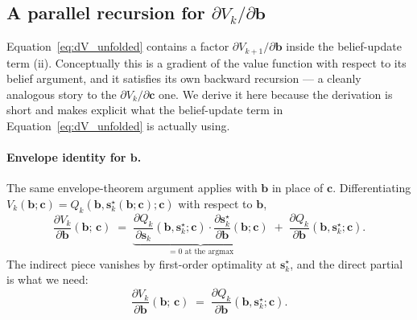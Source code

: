 \documentclass[11pt]{article}
\newcommand{\bc}{\bm{c}}
\newcommand{\bs}{\bm{s}}
\newcommand{\bb}{\bm{b}}
\begin{document}
\subsection{A parallel recursion for \texorpdfstring{$\partial V_k / \partial \bb$}{dV\_k/db}}
\label{sec:dV_db}

Equation~\eqref{eq:dV_unfolded} contains a factor $\partial V_{k+1} / \partial \bb$ inside the belief-update term (ii).  Conceptually this is a gradient of the value function with respect to its belief argument, and it satisfies its own backward recursion --- a cleanly analogous story to the $\partial V_k / \partial \bc$ one.  We derive it here because the derivation is short and makes explicit what the belief-update term in Equation~\eqref{eq:dV_unfolded} is actually using.

\paragraph{Envelope identity for $\bb$.}  The same envelope-theorem argument applies with $\bb$ in place of $\bc$.  Differentiating $V_k(\bb; \bc) = Q_k(\bb, \bs_k^\star(\bb; \bc); \bc)$ with respect to $\bb$,
\begin{equation}
\frac{\partial V_k}{\partial \bb}(\bb;\, \bc) \;=\; \underbrace{\frac{\partial Q_k}{\partial \bs_k}(\bb, \bs_k^\star; \bc) \cdot \frac{\partial \bs_k^\star}{\partial \bb}(\bb; \bc)}_{= 0 \text{ at the argmax}} \;+\; \frac{\partial Q_k}{\partial \bb}(\bb, \bs_k^\star; \bc).
\end{equation}
The indirect piece vanishes by first-order optimality at $\bs_k^\star$, and the direct partial is what we need:
\begin{equation}
\frac{\partial V_k}{\partial \bb}(\bb;\, \bc) \;=\; \frac{\partial Q_k}{\partial \bb}(\bb, \bs_k^\star; \bc).
\label{eq:env_identity_b}
\end{equation}
\end{document}
